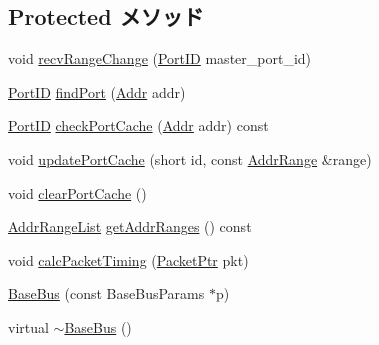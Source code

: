\subsection*{Protected メソッド}
\begin{DoxyCompactItemize}
\item 
void \hyperlink{classBaseBus_a85a99f51d8fef63034675b40df7eea7e}{recvRangeChange} (\hyperlink{base_2types_8hh_acef4d7d41cb21fdc252e20c04cd7bb8e}{PortID} master\_\-port\_\-id)
\item 
\hyperlink{base_2types_8hh_acef4d7d41cb21fdc252e20c04cd7bb8e}{PortID} \hyperlink{classBaseBus_a16872a256ea6eae168abc47d498841cb}{findPort} (\hyperlink{base_2types_8hh_af1bb03d6a4ee096394a6749f0a169232}{Addr} addr)
\item 
\hyperlink{base_2types_8hh_acef4d7d41cb21fdc252e20c04cd7bb8e}{PortID} \hyperlink{classBaseBus_a3ec7557ff2dd8a9390bbf310b3352ce2}{checkPortCache} (\hyperlink{base_2types_8hh_af1bb03d6a4ee096394a6749f0a169232}{Addr} addr) const 
\item 
void \hyperlink{classBaseBus_a3b429b2b5fe74236299bcb556d2308e7}{updatePortCache} (short id, const \hyperlink{classAddrRange}{AddrRange} \&range)
\item 
void \hyperlink{classBaseBus_a2b259c34a080563d0e03d5a1fec2cd7a}{clearPortCache} ()
\item 
\hyperlink{classstd_1_1list}{AddrRangeList} \hyperlink{classBaseBus_a36cf113d5e5e091ebddb32306c098fae}{getAddrRanges} () const 
\item 
void \hyperlink{classBaseBus_a0e69bf0fe1b87ac59689c3807a942ee7}{calcPacketTiming} (\hyperlink{classPacket}{PacketPtr} pkt)
\item 
\hyperlink{classBaseBus_aafbb881b411bf8ecd7696a6b6c9fbf5c}{BaseBus} (const BaseBusParams $\ast$p)
\item 
virtual \hyperlink{classBaseBus_a4c37180f5639002a5c75b2c1ec3c3ab4}{$\sim$BaseBus} ()
\end{DoxyCompactItemize}
